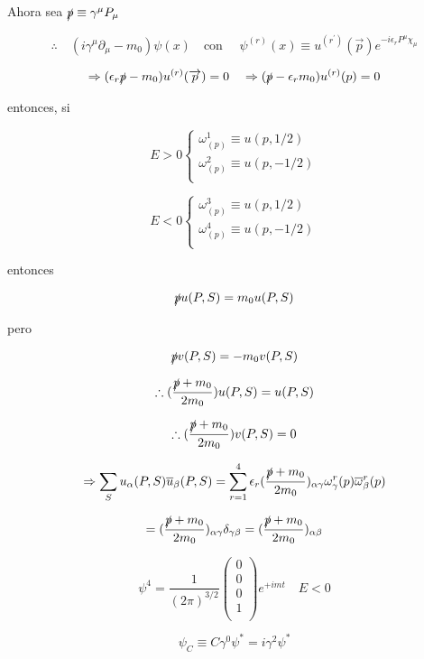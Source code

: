 \documentclass{report}
\begin{document}
Ahora sea $\slashed{p} \equiv \gamma^{\mu}P_{\mu}$

\[\therefore \quad (i \gamma^{\mu} \partial_{\mu}-m_0) \psi (x) \quad \text{con } \quad \psi^{(r)}(x) \equiv u^{(r^{\prime})} (\overrightarrow{p}) e^{-i \epsilon_{r}P^{\mu} \chi_{\mu}}\]

\[\Rightarrow (\epsilon_{r} \slashed{p}-m_0 ) u^{(r)} (\overrightarrow{p}) = 0 \quad \Rightarrow (\slashed{p} -\epsilon_{r} m_0 )u^{(r)}(p) = 0\]

entonces, si

\[ E >0
  \begin{cases}
    \omega_{(p)}^{1} \equiv u(p,1/2) \\
    \omega_{(p)}^{2} \equiv u(p,-1/2) \\
  \end{cases}
\]

\[ E < 0
  \begin{cases}
    \omega_{(p)}^{3} \equiv u(p,1/2) \\
    \omega_{(p)}^{4} \equiv u(p,-1/2) \\
  \end{cases}
\]

entonces

\[\slashed{p} u (P,S) = m_0 u(P,S)\]

pero

\[\slashed{p} v (P,S) = - m_0 v(P,S)\]

\[\therefore (\frac{\slashed{p}+m_0 }{2m_0 }) u(P,S) = u(P,S)\]

\[\therefore (\frac{\slashed{p}+m_0 }{2m_0 }) v(P,S) = 0 \]

\[\Rightarrow \sum_{S} u_{\alpha} (P,S) \overline{u}_{\beta} (P,S) = \sum_{r=1}^{4} \epsilon_{r} (\frac{\slashed{p}+m_0 }{2m_0 })_{\alpha \gamma} \omega_{\gamma}^{r}(p) \overline{\omega}_{\beta}^{r}(p) \]

\[= (\frac{\slashed{p}+m_0 }{2m_0 })_{\alpha \gamma} \delta_{\gamma \beta} = (\frac{\slashed{p}+m_0 }{2m_0 })_{\alpha \beta}\]

\[\psi^{4} = \frac{1}{(2 \pi)^{3/2}} \left ( \begin{array}{cccc}
 0   \\
 0   \\
 0   \\
 1   \\
 \end{array} \right) e^{+imt} \quad E<0\]

\[\psi_{C} \equiv C \gamma^{0}\psi^{*} = i \gamma^2 \psi^{*}\]
\end{document}

